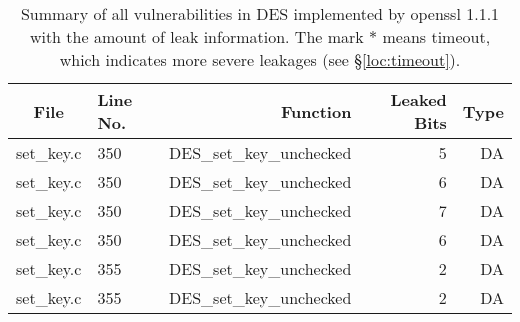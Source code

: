 \begin{table}%
\centering\tiny\scriptsize
\caption{Summary of all vulnerabilities in DES implemented by openssl 1.1.1 with the amount of leak information. The mark $*$ means timeout, which indicates more severe leakages (see \S\ref{loc:timeout}).}\label{tab:DESopenssl}
\begin{tabular}{clrrr}
\hline
\textbf{File} & \textbf{Line No.} & \textbf{Function} & \textbf{Leaked Bits} & \textbf{Type} \\\hline
set\_key.c& 350&DES\_set\_key\_unchecked&5 &DA\\
set\_key.c& 350&DES\_set\_key\_unchecked&6 &DA\\
set\_key.c& 350&DES\_set\_key\_unchecked&7 &DA\\
set\_key.c& 350&DES\_set\_key\_unchecked&6 &DA\\
set\_key.c& 355&DES\_set\_key\_unchecked&2 &DA\\
set\_key.c& 355&DES\_set\_key\_unchecked&2 &DA\\
\hline
\end{tabular}
\end{table}